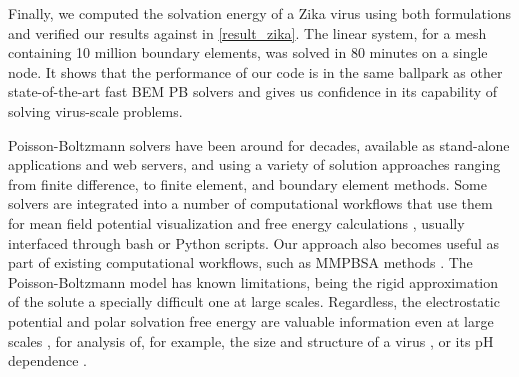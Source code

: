 Finally, we computed the solvation energy of a Zika virus using both formulations and verified our results against \pygbe in \ref{result_zika}.
The linear system, for a mesh containing 10 million boundary elements, was solved in 80 minutes on a single node.
It shows that the performance of our code is in the same ballpark as other state-of-the-art fast BEM PB solvers \cite{GengKrasny2013,ZhangPengHuangPitsianisSunLu2015,CooperBardhanBarba2014} and gives us confidence in its capability of solving virus-scale problems.

Poisson-Boltzmann solvers have been around for decades, available as stand-alone applications and web servers, and using a variety of solution approaches \cite{JurrusETal2018} ranging from finite difference, to finite element, and boundary element methods.
Some solvers are integrated into a number of computational workflows that use them for mean field potential visualization \cite{HumphreyETal1996} and free energy calculations \cite{MillerETal2012,KumariETal2014}, usually interfaced through bash or Python scripts.
Our approach also becomes useful as part of existing computational workflows, such as MMPBSA methods \cite{WangETal2018}.
The Poisson-Boltzmann model has known limitations, being the rigid approximation of the solute a specially difficult one at large scales. 
Regardless, the electrostatic potential and polar solvation free energy are valuable information even at large scales \cite{LiETal2019}, for analysis of, for example, the size and structure of a virus \cite{SiberETal2012}, or its pH dependence \cite{RoshalETal2019}. 

